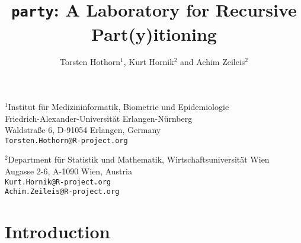 \documentclass[letter]{article}
\begin{document}
\title{\texttt{party}: A Laboratory for Recursive Part(y)itioning}
\author{Torsten Hothorn$^1$, Kurt Hornik$^2$ and Achim Zeileis$^2$}
\date{}
\maketitle

\noindent$^1$Institut f\"ur Medizininformatik, Biometrie und Epidemiologie\\
     Friedrich-Alexander-Universit\"at Erlangen-N\"urnberg\\
     Waldstra{\ss}e 6, D-91054 Erlangen, Germany \\
     \texttt{Torsten.Hothorn@R-project.org}
\newline

\noindent$^2$Department f\"ur Statistik und Mathematik,
             Wirtschaftsuniversit\"at Wien \\
       Augasse 2-6, A-1090 Wien, Austria \\
       \texttt{Kurt.Hornik@R-project.org} \\
       \texttt{Achim.Zeileis@R-project.org} 
\newline






\section{Introduction}
\end{document}

